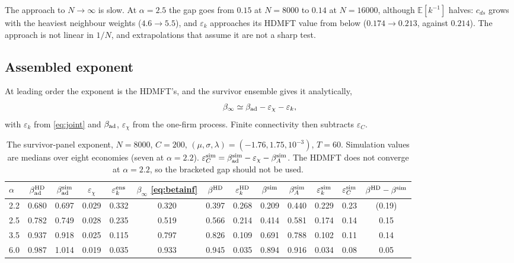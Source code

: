 \documentclass[11pt]{article}
\newcommand{\E}{\mathbb E}
\newcommand{\bad}{\beta_{\rm ad}}
\begin{document}
The approach to $N\to\infty$ is slow.  At $\alpha=2.5$ the gap goes from $0.15$ at $N=8000$ to $0.14$
at $N=16000$, although $\E[k^{-1}]$ halves: $c_{ds}$ grows with the heaviest neighbour weights
($4.6\to5.5$), and $\varepsilon_k$ approaches its HDMFT value from below ($0.174\to0.213$, against
$0.214$).  The approach is not linear in $1/N$, and extrapolations that assume it are not a sharp
test.

\subsection{Assembled exponent}

At leading order the exponent is the HDMFT's, and the survivor ensemble gives it analytically,
\begin{equation}
  \beta_\infty\simeq\bad-\varepsilon_\chi-\varepsilon_k ,
  \label{eq:betainf}
\end{equation}
with $\varepsilon_k$ from \eqref{eq:joint} and $\bad$, $\varepsilon_\chi$ from the one-firm process.
Finite connectivity then subtracts $\varepsilon_C$.

\begin{table}[htbp]
\centering\small\setlength{\tabcolsep}{3.5pt}
\begin{tabular}{l|cc|ccc|cc|ccc|cc}
\toprule
$\alpha$ & $\bad^{\rm HD}$ & $\bad^{\rm sim}$ & $\varepsilon_\chi$ & $\varepsilon_k^{\rm ens}$ & $\beta_\infty$ \eqref{eq:betainf}
 & $\beta^{\rm HD}$ & $\varepsilon_k^{\rm HD}$ & $\beta^{\rm sim}$ & $\beta_A^{\rm sim}$ & $\varepsilon_k^{\rm sim}$
 & $\varepsilon_C^{\rm sim}$ & $\beta^{\rm HD}-\beta^{\rm sim}$\\
\midrule
2.2 & 0.680 & 0.697 & 0.029 & 0.332 & 0.320 & 0.397 & 0.268 & 0.209 & 0.440 & 0.229 & 0.23 & (0.19)\\
2.5 & 0.782 & 0.749 & 0.028 & 0.235 & 0.519 & 0.566 & 0.214 & 0.414 & 0.581 & 0.174 & 0.14 & 0.15\\
3.5 & 0.937 & 0.918 & 0.025 & 0.115 & 0.797 & 0.826 & 0.109 & 0.691 & 0.788 & 0.102 & 0.11 & 0.14\\
6.0 & 0.987 & 1.014 & 0.019 & 0.035 & 0.933 & 0.945 & 0.035 & 0.894 & 0.916 & 0.034 & 0.08 & 0.05\\
\bottomrule
\end{tabular}
\caption{The survivor-panel exponent, $N=8000$, $C=200$, $(\mu,\sigma,\lambda)=(-1.76,1.75,10^{-3})$,
$T=60$.  Simulation values are medians over eight economies (seven at $\alpha=2.2$).
$\varepsilon_C^{\rm sim}=\bad^{\rm sim}-\varepsilon_\chi-\beta_A^{\rm sim}$.  The HDMFT does not converge
at $\alpha=2.2$, so the bracketed gap should not be used.}
\label{tab:beta}
\end{table}
\end{document}
